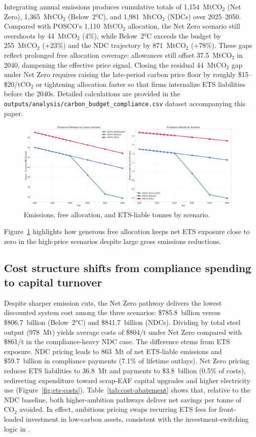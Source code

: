 \documentclass[preprint,1p,authoryear]{elsarticle}
\begin{document}
Integrating annual emissions produces cumulative totals of 1{,}154~MtCO$_2$ (Net Zero), 1{,}365~MtCO$_2$ (Below~2°C), and 1{,}981~MtCO$_2$ (NDCs) over 2025--2050. Compared with POSCO's 1{,}110~MtCO$_2$ allocation, the Net Zero scenario still overshoots by 44~MtCO$_2$ (4\%), while Below~2°C exceeds the budget by 255~MtCO$_2$ (+23\%) and the NDC trajectory by 871~MtCO$_2$ (+78\%). These gaps reflect prolonged free allocation coverage: allowances still offset 37.5~MtCO$_2$ in 2040, dampening the effective price signal. Closing the residual 44~MtCO$_2$ gap under Net Zero requires raising the late-period carbon price floor by roughly \$15--\$20/tCO$_2$ or tightening allocation faster so that firms internalize ETS liabilities before the 2040s. Detailed calculations are provided in the \texttt{outputs/analysis/carbon\_budget\_compliance.csv} dataset accompanying this paper.

\begin{figure}[!t]
  \centering
  \includegraphics[width=0.85\linewidth]{emissions_pathways}
  \caption{Emissions, free allocation, and ETS-liable tonnes by scenario.}
  \label{fig:emissions-pathways}
\end{figure}

Figure~\ref{fig:emissions-pathways} highlights how generous free allocation keeps net ETS exposure close to zero in the high-price scenarios despite large gross emissions reductions.

\subsection{Cost structure shifts from compliance spending to capital turnover}

Despite sharper emission cuts, the Net Zero pathway delivers the lowest discounted system cost among the three scenarios: \$785.8~billion versus \$806.7~billion (Below~2°C) and \$841.7~billion (NDCs). Dividing by total steel output (978~Mt) yields average costs of \$804/t under Net Zero compared with \$861/t in the compliance-heavy NDC case. The difference stems from ETS exposure. NDC pricing leads to 863~Mt of net ETS-liable emissions and \$59.7~billion in compliance payments (7.1\% of lifetime outlays). Net Zero pricing reduces ETS liabilities to 36.8~Mt and payments to \$3.8~billion (0.5\% of costs), redirecting expenditure toward scrap-EAF capital upgrades and higher electricity use (Figure~\ref{fig:ets-costs}). Table~\ref{tab:cost-abatement} shows that, relative to the NDC baseline, both higher-ambition pathways deliver net savings per tonne of CO$_2$ avoided. In effect, ambitious pricing swaps recurring ETS fees for front-loaded investment in low-carbon assets, consistent with the investment-switching logic in \citet{fowlie2016carbon}.
\end{document}
